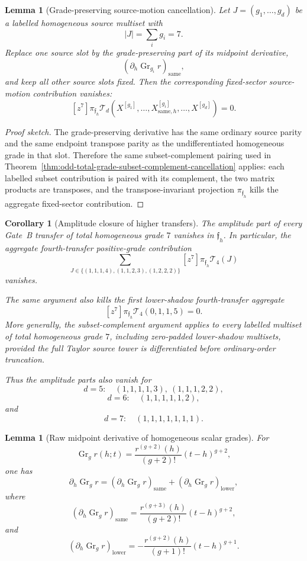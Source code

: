 \documentclass[11pt,a4paper]{amsart}
\theoremstyle{plain}
\newtheorem{lemma}[theorem]{Lemma}
\newtheorem{corollary}[theorem]{Corollary}
\theoremstyle{definition}
\begin{document}
\begin{lemma}[Grade-preserving source-motion cancellation]
\label{lem:grade-preserving-source-motion-cancellation}
Let \(J=(g_1,\ldots,g_d)\) be a labelled homogeneous source multiset with
\[
|J|=\sum_i g_i=7.
\]
Replace one source slot by the grade-preserving part of its midpoint
derivative,
\[
(\partial_h\operatorname{Gr}_{g_i}r)_{\mathrm{same}},
\]
and keep all other source slots fixed.  Then the corresponding fixed-sector
source-motion contribution vanishes:
\[
[z^7]\pi_{\mathfrak f_h}
\mathcal T_d
\left(
X^{[g_1]},\ldots,
X^{[g_i]}_{\mathrm{same},h},
\ldots,
X^{[g_d]}
\right)
=0.
\]
\end{lemma}

\begin{proof}[Proof sketch]
The grade-preserving derivative has the same ordinary source parity and
the same endpoint transpose parity as the undifferentiated homogeneous
grade in that slot.  Therefore the same subset-complement pairing used in
Theorem~\ref{thm:odd-total-grade-subset-complement-cancellation} applies:
each labelled subset contribution is paired with its complement, the two
matrix products are transposes, and the transpose-invariant projection
\(\pi_{\mathfrak f_h}\) kills the aggregate fixed-sector contribution.
\end{proof}

\begin{corollary}[Amplitude closure of higher transfers]
\label{cor:amplitude-closure-higher-transfers}
The amplitude part of every Gate~B transfer of total homogeneous grade
\(7\) vanishes in \(\mathfrak f_h\).  In particular, the aggregate
fourth-transfer positive-grade contribution
\[
\sum_{J\in\{(1,1,1,4),(1,1,2,3),(1,2,2,2)\}}
[z^7]\pi_{\mathfrak f_h}\mathcal T_4(J)
\]
vanishes.

The same argument also kills the first lower-shadow fourth-transfer
aggregate
\[
[z^7]\pi_{\mathfrak f_h}\mathcal T_4(0,1,1,5)=0.
\]
More generally, the subset-complement argument applies to every labelled
multiset of total homogeneous grade \(7\), including zero-padded
lower-shadow multisets, provided the full Taylor source tower is
differentiated before ordinary-order truncation.

Thus the amplitude parts also vanish for
\[
d=5:\quad (1,1,1,1,3),\ (1,1,1,2,2),
\]
\[
d=6:\quad (1,1,1,1,1,2),
\]
and
\[
d=7:\quad (1,1,1,1,1,1,1).
\]
\end{corollary}

\begin{lemma}[Raw midpoint derivative of homogeneous scalar grades]
\label{lem:raw-midpoint-derivative-homogeneous-scalar-grades}
For
\[
\operatorname{Gr}_g r(h;t)
=
\frac{r^{(g+2)}(h)}{(g+2)!}(t-h)^{g+2},
\]
one has
\[
\partial_h\operatorname{Gr}_g r
=
(\partial_h\operatorname{Gr}_g r)_{\mathrm{same}}
+
(\partial_h\operatorname{Gr}_g r)_{\mathrm{lower}},
\]
where
\[
(\partial_h\operatorname{Gr}_g r)_{\mathrm{same}}
=
\frac{r^{(g+3)}(h)}{(g+2)!}(t-h)^{g+2},
\]
and
\[
(\partial_h\operatorname{Gr}_g r)_{\mathrm{lower}}
=
-\frac{r^{(g+2)}(h)}{(g+1)!}(t-h)^{g+1}.
\]
\end{lemma}
\end{document}
